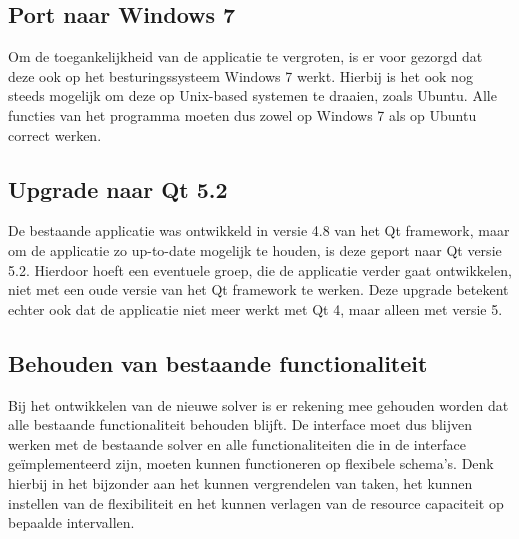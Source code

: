 \subsection{Port naar Windows 7}
Om de toegankelijkheid van de applicatie te vergroten, is er voor gezorgd dat deze ook op het besturingssysteem Windows 7 werkt. Hierbij is het ook nog steeds mogelijk om deze op Unix-based systemen te draaien, zoals Ubuntu. Alle functies van het programma moeten dus zowel op Windows 7 als op Ubuntu correct werken.

\subsection{Upgrade naar Qt 5.2}
De bestaande applicatie was ontwikkeld in versie 4.8 van het Qt framework, maar om de applicatie zo up-to-date mogelijk te houden, is deze geport naar Qt versie 5.2. Hierdoor hoeft een eventuele groep, die de applicatie verder gaat ontwikkelen, niet met een oude versie van het Qt framework te werken. Deze upgrade betekent echter ook dat de applicatie niet meer werkt met Qt 4, maar alleen met versie 5.

\subsection{Behouden van bestaande functionaliteit}
Bij het ontwikkelen van de nieuwe solver is er rekening mee gehouden worden dat alle bestaande functionaliteit behouden blijft. De interface moet dus blijven werken met de bestaande solver en alle functionaliteiten die in de interface ge\"implementeerd zijn, moeten kunnen functioneren op flexibele schema's. Denk hierbij in het bijzonder aan het kunnen vergrendelen van taken, het kunnen instellen van de flexibiliteit en het kunnen verlagen van de resource capaciteit op bepaalde intervallen.
